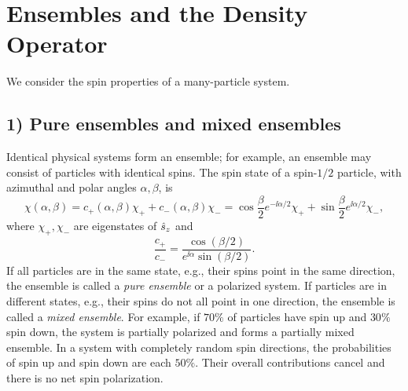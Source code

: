 \section{Ensembles and the Density Operator}
We consider the spin properties of a many-particle system.

\subsection*{1) Pure ensembles and mixed ensembles}
Identical physical systems form an ensemble; for example, an ensemble may consist of particles with identical spins. The spin state of a spin-$1/2$ particle, with azimuthal and polar angles $\alpha,\beta$, is
\begin{equation}
\chi(\alpha,\beta)=c_+(\alpha,\beta)\chi_++c_-(\alpha,\beta)\chi_-
=\cos\frac\beta2e^{-\ii\alpha/2}\chi_+
+\sin\frac\beta2e^{\ii\alpha/2}\chi_-,
\end{equation}
where $\chi_+,\chi_-$ are eigenstates of $\hat{s}_z$ and
\begin{equation}
\frac{c_+}{c_-}=\frac{\cos(\beta/2)}{e^{\ii\alpha}\sin(\beta/2)}.
\end{equation}
If all particles are in the same state, e.g., their spins point in the same direction, the ensemble is called a \emph{pure ensemble} or a polarized system. If particles are in different states, e.g., their spins do not all point in one direction, the ensemble is called a \emph{mixed ensemble}. For example, if $70\%$ of particles have spin up and $30\%$ spin down, the system is partially polarized and forms a partially mixed ensemble. In a system with completely random spin directions, the probabilities of spin up and spin down are each $50\%$. Their overall contributions cancel and there is no net spin polarization.

